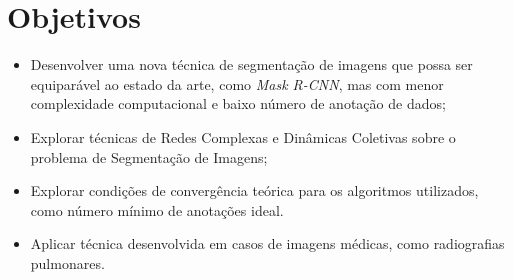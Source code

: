 \chapter{Objetivos}\label{cap:objetivos}

\begin{itemize}
\item Desenvolver uma nova técnica de segmentação de imagens que possa ser
equiparável ao estado da arte, como \textit{Mask R-CNN}, mas com menor
complexidade computacional e baixo número de anotação de dados;
\item Explorar técnicas de Redes Complexas e Dinâmicas Coletivas sobre
  o problema de Segmentação de Imagens;
\item Explorar condições de convergência teórica para os algoritmos
  utilizados, como número mínimo de anotações ideal.
\item Aplicar técnica desenvolvida em casos de imagens médicas, como
  radiografias pulmonares.
\end{itemize}

